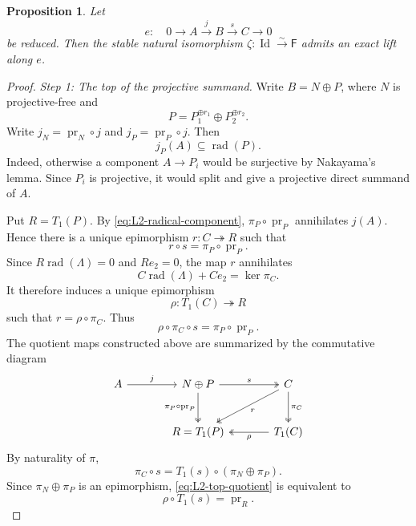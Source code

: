 \documentclass[a4paper,11pt,reqno]{amsart}
\newtheorem{proposition}[proposition]{Proposition}
\theoremstyle{definition}
\theoremstyle{plain}
\numberwithin{equation}{section}
\begin{document}
\begin{proposition}
\label{prop:L2-exact-lifting}
Let
\begin{equation}
\label{eq:L2-reduced-sequence}
 e:\quad
 0\longrightarrow A\xrightarrow{j}B\xrightarrow{s}C\longrightarrow0
\end{equation}
be reduced.  Then the stable natural isomorphism
\(\zeta:\operatorname{Id}\xrightarrow{\sim}\mathsf F\) admits an exact
lift along \(e\).
\end{proposition}

\begin{proof}
\smallskip\noindent\emph{Step 1: The top of the projective summand.}
Write \(B=N\oplus P\), where \(N\) is projective-free and
\[
 P=P_1^{\oplus r_1}\oplus P_2^{\oplus r_2}.
\]
Write \(j_N=\operatorname{pr}_N\circ j\) and
\(j_P=\operatorname{pr}_P\circ j\).  Then
\begin{equation}
\label{eq:L2-radical-component}
 j_P(A)\subseteq\operatorname{rad}(P).
\end{equation}
Indeed, otherwise a component \(A\to P_i\) would be surjective by
Nakayama's lemma.  Since \(P_i\) is projective, it would split and give a
projective direct summand of \(A\).

Put \(R=T_1(P)\).  By \eqref{eq:L2-radical-component},
\(\pi_P\circ\operatorname{pr}_P\) annihilates \(j(A)\).  Hence there is a
unique epimorphism \(r:C\twoheadrightarrow R\) such that
\begin{equation}
\label{eq:L2-module-quotient}
 r\circ s=\pi_P\circ\operatorname{pr}_P.
\end{equation}
Since \(R\operatorname{rad}(\Lambda)=0\) and \(Re_2=0\), the map \(r\)
annihilates
\[
 C\operatorname{rad}(\Lambda)+Ce_2=\ker\pi_C.
\]
It therefore induces a unique epimorphism
\[
 \rho:T_1(C)\twoheadrightarrow R
\]
such that \(r=\rho\circ\pi_C\).  Thus
\begin{equation}
\label{eq:L2-top-quotient}
\rho\circ\pi_C\circ s
 =\pi_P\circ\operatorname{pr}_P.
\end{equation}
The quotient maps constructed above are summarized by the commutative
diagram
\begin{equation*}
\begin{tikzcd}[column sep=large,row sep=large]
A\arrow[r,"j"]&
N\oplus P\arrow[r,two heads,"s"]
 \arrow[d,two heads,"\pi_P\circ\operatorname{pr}_P"']&
C\arrow[dl,two heads,"r"]
 \arrow[d,two heads,"\pi_C"]\\
&R=T_1(P)&T_1(C)\arrow[l,two heads,"\rho"]
\end{tikzcd}
\end{equation*}
By naturality of \(\pi\),
\[
 \pi_C\circ s
 =T_1(s)\circ(\pi_N\oplus\pi_P).
\]
Since \(\pi_N\oplus\pi_P\) is an epimorphism,
\eqref{eq:L2-top-quotient} is equivalent to
\begin{equation}
\label{eq:L2-top-square}
 \rho\circ T_1(s)=\operatorname{pr}_R.
\end{equation}


\end{proof}
\end{document}
